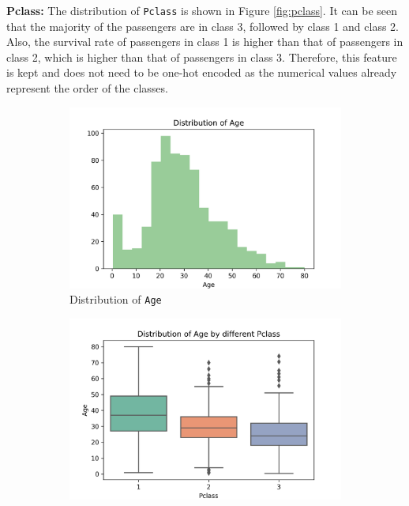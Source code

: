 \documentclass[10pt]{article}
\begin{document}
\textbf{Pclass:} The distribution of \texttt{Pclass} is shown in Figure \ref{fig:pclass}. It can be seen that the majority of the passengers are in class 3, followed by class 1 and class 2. Also, the survival rate of passengers in class 1 is higher than that of passengers in class 2, which is higher than that of passengers in class 3. Therefore, this feature is kept and does not need to be one-hot encoded as the numerical values already represent the order of the classes.

\begin{figure}[!htbp]
    \centering
    \begin{subfigure}[b]{0.49\textwidth}
        \centering
        \includegraphics[width=\textwidth]{../hw1/img/Part_II/distribution_of_age.png}
        \caption{Distribution of \texttt{Age}}
        \label{fig:age_distribution}
    \end{subfigure}
    \hfill
    \begin{subfigure}[b]{0.49\textwidth}
        \centering
        \includegraphics[width=\textwidth]{../hw1/img/Part_II/distribution_of_age_by_pclass.png}

\end{subfigure}
\end{figure}
\end{document}
